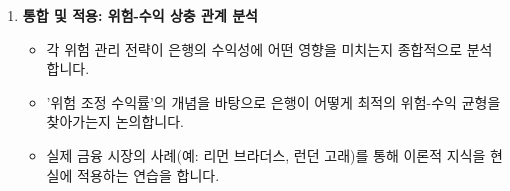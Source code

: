 \documentclass[11pt,a4paper]{article}
\begin{document}
\begin{tcolorbox}[mybox, title=\textbf{모듈 3 학습 로드맵}]
\begin{enumerate}
    \item \textbf{통합 및 적용: 위험-수익 상충 관계 분석}
    \begin{itemize}
        \item 각 위험 관리 전략이 은행의 수익성에 어떤 영향을 미치는지 종합적으로 분석합니다.
        \item '위험 조정 수익률'의 개념을 바탕으로 은행이 어떻게 최적의 위험-수익 균형을 찾아가는지 논의합니다.
        \item 실제 금융 시장의 사례(예: 리먼 브라더스, 런던 고래)를 통해 이론적 지식을 현실에 적용하는 연습을 합니다.
    \end{itemize}
\end{enumerate}
\end{tcolorbox}
\end{document}
